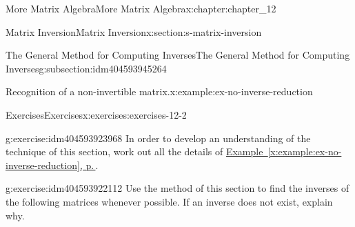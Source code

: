 \documentclass[twoside,10pt,]{book}
\newcommand{\xreffont}{\relax}
\numberwithin{equation}{section}
\begin{document}
\begin{chapterptx}{More Matrix Algebra}{}{More Matrix Algebra}{}{}{x:chapter:chapter_12}
\begin{sectionptx}{Matrix Inversion}{}{Matrix Inversion}{}{}{x:section:s-matrix-inversion}
\begin{subsectionptx}{The General Method for Computing Inverses}{}{The General Method for Computing Inverses}{}{}{g:subsection:idm404593945264}
\begin{example}{Recognition of a non-invertible matrix.}{x:example:ex-no-inverse-reduction}
\end{example}
\end{subsectionptx}
%
%
\typeout{************************************************}
\typeout{************************************************}
%
\begin{exercises-subsection}{Exercises}{}{Exercises}{}{}{x:exercises:exercises-12-2}
\begin{divisionexercise}{1}{}{}{g:exercise:idm404593923968}%
In order to develop an understanding of the technique of this section, work out all the details of \hyperref[x:example:ex-no-inverse-reduction]{Example~{\xreffont\ref{x:example:ex-no-inverse-reduction}}, p.\,\pageref{x:example:ex-no-inverse-reduction}}.%
\end{divisionexercise}%
\begin{divisionexercise}{2}{}{}{g:exercise:idm404593922112}%
Use the method of this section to find the inverses of the following matrices whenever possible. If an inverse does not exist, explain why.%
\begin{multicols}{2}
\end{multicols}
\end{divisionexercise}
\end{exercises-subsection}
\end{sectionptx}
\end{chapterptx}
\end{document}
